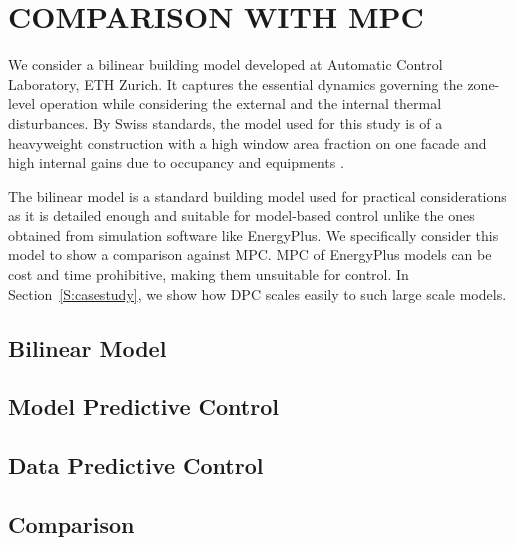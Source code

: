 \section{COMPARISON WITH MPC}
\label{S:proof}

We consider a bilinear building model developed at Automatic Control Laboratory, ETH Zurich.
It captures the essential dynamics governing the zone-level operation while considering the external and the internal thermal disturbances. 
By Swiss standards, the model used for this study is of a heavyweight construction with a high window area fraction on one facade and high internal gains due to occupancy and equipments \cite{Gyalistras2010a}. 

The bilinear model is a standard building model used for practical considerations \cite{Ma2015,Oldewurtel2011,Oldewurtel2012} as it is detailed enough and suitable for model-based control unlike the ones obtained from simulation software like EnergyPlus. We specifically consider this model to show a comparison against MPC. 
MPC of EnergyPlus models can be cost and time prohibitive, making them unsuitable for control. In Section~\ref{S:casestudy}, we show how DPC scales easily to such large scale models.

\subsection{Bilinear Model}
\label{SS:model}


\subsection{Model Predictive Control}
\label{SS:mpc}


\subsection{Data Predictive Control}
\label{SS:dpc}


\subsection{Comparison}
\label{SS:comp}

